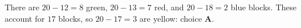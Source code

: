 There are $20-12=8$ green, $20-13=7$ red, and $20-18=2$ blue blocks. These account for $17$ blocks, so $20-17=\boxed{3}$ are yellow: choice \textbf{A}.
